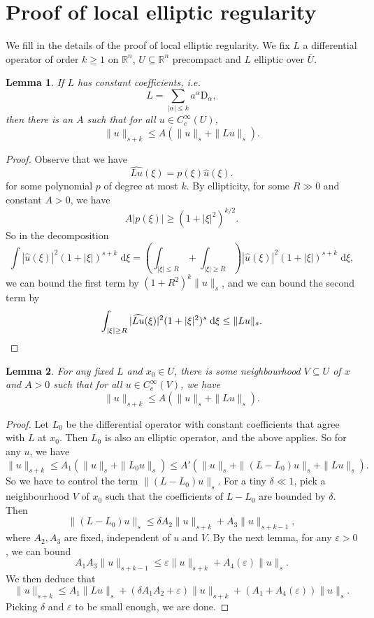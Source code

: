 \documentclass{shortart}
\newtheorem*{lemma}{Lemma}
\theoremstyle{definition}
\newcommand\R{\mathbb{R}}
\renewcommand\d{\mathrm{d}}
\newcommand\D{\mathrm{D}}
\begin{document}
\appendices
\section{Proof of local elliptic regularity}
We fill in the details of the proof of local elliptic regularity. We fix $L$ a differential operator of order $k \geq 1$ on $\R^n$, $U \subseteq \R^n$ precompact and $L$ elliptic over $\bar{U}$.
\begin{lemma}
  If $L$ has constant coefficients, i.e.
  \[
    L = \sum_{|\alpha| \leq k} a^\alpha \D_\alpha,
  \]
  then there is an $A$ such that for all $u \in C_c^\infty(U)$,
  \[
    \|u\|_{s + k} \leq A(\|u\|_s + \|Lu\|_{s}).
  \]
\end{lemma}

\begin{proof}
  Observe that we have
  \[
    \widehat{Lu}(\xi) = p(\xi) \hat{u}(\xi).
  \]
  for some polynomial $p$ of degree at most $k$. By ellipticity, for some $R \gg 0$ and constant $A > 0$, we have
  \[
    A |p(\xi)| \geq (1 + |\xi|^2)^{k/2}.
  \]
  So in the decomposition
  \[
    \int |\hat{u}(\xi)|^2 (1 + |\xi|)^{s + k} \;\d \xi = \left(\int_{|\xi| \leq R} + \int_{|\xi| \geq R}\right) |\hat{u}(\xi)|^2 (1 + |\xi|)^{s + k} \;\d \xi,
  \]
  we can bound the first term by $(1 + R^2)^k \|u\|_s$, and we can bound the second term by
  \[
    \int_{|\xi|\geq R} |\widehat{Lu}(\xi)|^2 (1 + |\xi|^2)^s\;\d \xi  \leq \|Lu\|_s.\qedhere
  \]
\end{proof}

\begin{lemma}
  For any fixed $L$ and $x_0 \in U$, there is some neighbourhood $V \subseteq U$ of $x$ and $A > 0$ such that for all $u \in C_c^\infty(V)$, we have
  \[
    \|u\|_{s + k} \leq A(\|u\|_s + \|Lu\|_{s}).
  \]
\end{lemma}

\begin{proof}
  Let $L_0$ be the differential operator with constant coefficients that agree with $L$ at $x_0$. Then $L_0$ is also an elliptic operator, and the above applies. So for any $u$, we have
  \[
    \|u\|_{s + k} \leq A_1(\|u\|_s + \|L_0u\|_s) \leq A'(\|u\|_s + \|(L - L_0) u\|_s + \|Lu\|_s).
  \]
  So we have to control the term $\|(L - L_0)u\|_s$. For a tiny $\delta \ll 1$, pick a neighbourhood $V$ of $x_0$ such that the coefficients of $L - L_0$ are bounded by $\delta$. Then
  \[
    \|(L - L_0)u\|_s \leq \delta A_2 \|u\|_{s + k} + A_3 \|u\|_{s + k- 1},
  \]
  where $A_2, A_3$ are fixed, independent of $u$ and $V$. By the next lemma, for any $\varepsilon > 0$, we can bound
  \[
    A_1 A_3 \|u\|_{s + k - 1} \leq \varepsilon \|u\|_{s + k} + A_4(\varepsilon) \|u\|_s.
  \]
  We then deduce that
  \[
    \|u\|_{s + k} \leq A_1 \|Lu\|_s + (\delta A_1 A_2 + \varepsilon) \|u\|_{s + k} + (A_1 + A_4(\varepsilon)) \|u\|_s.
  \]
  Picking $\delta$ and $\varepsilon$ to be small enough, we are done.
\end{proof}
\end{document}
